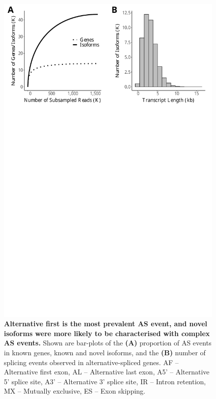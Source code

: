 \vspace{1cm}
\begin{figure}[!h]
	\begin{center}
		\includegraphics[page=5,trim={0 26cm 0 0},clip,scale = 0.55]{Figures/IsoSeqWholeTranscriptome.pdf}
	\end{center}
	\captionsetup{width=0.95\textwidth}
	\caption[Alternative splicing events from transcriptome profiling of the mouse cortex]%
	{\textbf{Alternative first is the most prevalent AS event, and novel isoforms were more likely to be characterised with complex AS events.} Shown are bar-plots of the \textbf{(A)} proportion of AS events in known genes, known and novel isoforms, and the \textbf{(B)} number of splicing events observed in alternative-spliced genes. AF – Alternative first exon, AL – Alternative last exon, A5’ – Alternative 5’ splice site, A3’ – Alternative 3’ splice site, IR – Intron retention, MX – Mutually exclusive, ES – Exon skipping.}
	\label{fig:isoseq_whole_As_events}
\end{figure}


